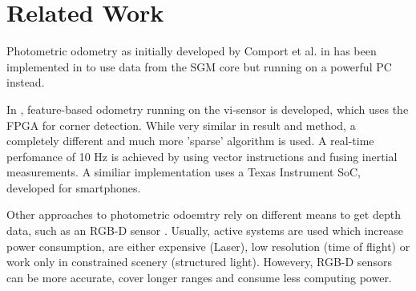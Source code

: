 \section{Related Work}
\label{sec:related_work}

Photometric odometry as initially developed by Comport et al. in
\cite{comport2007odometry} has been implemented in \cite{omaridenseodometry} to
use data from the SGM core but running on a powerful PC instead.

In \cite{marcin2014odometry}, feature-based odometry running on the vi-sensor
is developed, which uses the FPGA for corner detection. While very similar in
result and method, a completely different and much more 'sparse' algorithm is
used. A real-time perfomance of 10 Hz is achieved by using vector instructions
and fusing inertial measurements.  A similiar implementation
\cite{goldberg2011stereo} uses a Texas Instrument SoC, developed for
smartphones.

Other approaches to photometric odoemtry rely on different means to get depth
data, such as an RGB-D sensor \cite{kerl2013robust}. Usually, active systems
are used which increase power consumption, are either expensive (Laser), low
resolution (time of flight) or work only in constrained scenery (structured
light). Howevery, RGB-D sensors can be more accurate, cover longer ranges and
consume less computing power.
